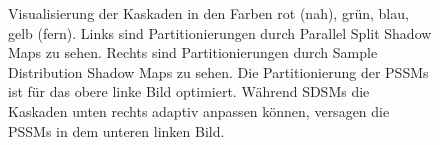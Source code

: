 \documentclass[runningheaders,a4paper]{llncs}
\begin{document}
\begin{figure}
	\centering


	\caption{
Visualisierung der Kaskaden in den Farben rot (nah), grün, blau, gelb (fern).
Links sind Partitionierungen durch Parallel Split Shadow Maps zu sehen.
Rechts sind Partitionierungen durch Sample Distribution Shadow Maps zu sehen.
Die Partitionierung der PSSMs ist für das obere linke Bild optimiert.
Während SDSMs die Kaskaden unten rechts adaptiv anpassen können, versagen die PSSMs in dem unteren linken Bild.
}
\end{figure}
\end{document}
